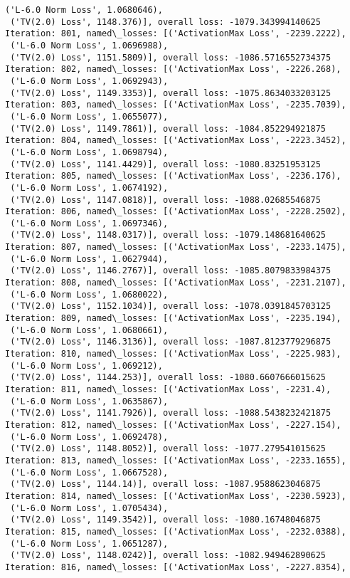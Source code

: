 \documentclass[10pt]{article}
\begin{document}
\begin{Verbatim}[commandchars=\\\{\}]
 ('L-6.0 Norm Loss', 1.0680646),
 ('TV(2.0) Loss', 1148.376)], overall loss: -1079.343994140625
Iteration: 801, named\_losses: [('ActivationMax Loss', -2239.2222),
 ('L-6.0 Norm Loss', 1.0696988),
 ('TV(2.0) Loss', 1151.5809)], overall loss: -1086.5716552734375
Iteration: 802, named\_losses: [('ActivationMax Loss', -2226.268),
 ('L-6.0 Norm Loss', 1.0692943),
 ('TV(2.0) Loss', 1149.3353)], overall loss: -1075.8634033203125
Iteration: 803, named\_losses: [('ActivationMax Loss', -2235.7039),
 ('L-6.0 Norm Loss', 1.0655077),
 ('TV(2.0) Loss', 1149.7861)], overall loss: -1084.852294921875
Iteration: 804, named\_losses: [('ActivationMax Loss', -2223.3452),
 ('L-6.0 Norm Loss', 1.0698794),
 ('TV(2.0) Loss', 1141.4429)], overall loss: -1080.83251953125
Iteration: 805, named\_losses: [('ActivationMax Loss', -2236.176),
 ('L-6.0 Norm Loss', 1.0674192),
 ('TV(2.0) Loss', 1147.0818)], overall loss: -1088.02685546875
Iteration: 806, named\_losses: [('ActivationMax Loss', -2228.2502),
 ('L-6.0 Norm Loss', 1.0697346),
 ('TV(2.0) Loss', 1148.0317)], overall loss: -1079.148681640625
Iteration: 807, named\_losses: [('ActivationMax Loss', -2233.1475),
 ('L-6.0 Norm Loss', 1.0627944),
 ('TV(2.0) Loss', 1146.2767)], overall loss: -1085.8079833984375
Iteration: 808, named\_losses: [('ActivationMax Loss', -2231.2107),
 ('L-6.0 Norm Loss', 1.0680022),
 ('TV(2.0) Loss', 1152.1034)], overall loss: -1078.0391845703125
Iteration: 809, named\_losses: [('ActivationMax Loss', -2235.194),
 ('L-6.0 Norm Loss', 1.0680661),
 ('TV(2.0) Loss', 1146.3136)], overall loss: -1087.8123779296875
Iteration: 810, named\_losses: [('ActivationMax Loss', -2225.983),
 ('L-6.0 Norm Loss', 1.069212),
 ('TV(2.0) Loss', 1144.253)], overall loss: -1080.6607666015625
Iteration: 811, named\_losses: [('ActivationMax Loss', -2231.4),
 ('L-6.0 Norm Loss', 1.0635867),
 ('TV(2.0) Loss', 1141.7926)], overall loss: -1088.5438232421875
Iteration: 812, named\_losses: [('ActivationMax Loss', -2227.154),
 ('L-6.0 Norm Loss', 1.0692478),
 ('TV(2.0) Loss', 1148.8052)], overall loss: -1077.279541015625
Iteration: 813, named\_losses: [('ActivationMax Loss', -2233.1655),
 ('L-6.0 Norm Loss', 1.0667528),
 ('TV(2.0) Loss', 1144.14)], overall loss: -1087.9588623046875
Iteration: 814, named\_losses: [('ActivationMax Loss', -2230.5923),
 ('L-6.0 Norm Loss', 1.0705434),
 ('TV(2.0) Loss', 1149.3542)], overall loss: -1080.16748046875
Iteration: 815, named\_losses: [('ActivationMax Loss', -2232.0388),
 ('L-6.0 Norm Loss', 1.0651287),
 ('TV(2.0) Loss', 1148.0242)], overall loss: -1082.949462890625
Iteration: 816, named\_losses: [('ActivationMax Loss', -2227.8354),

\end{Verbatim}
\end{document}

